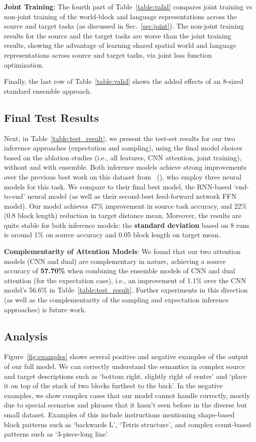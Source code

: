 \documentclass[letterpaper]{article} %
\newcommand{\newcite}[1]{\citeauthor{#1} (\citeyear{#1})}
\begin{document}
\textbf{Joint Training}:
The fourth part of Table~\ref{table:valid} compares  joint training vs non-joint training of the world-block and language representations across the source and target tasks (as discussed in Sec.~\ref{sec:joint}). The non-joint training results for the source and the target tasks are worse than the joint training results, showing the advantage of learning shared spatial world and language representations across source and target tasks, via joint loss function optimization.

Finally, the last row of Table~\ref{table:valid} shows the added effects of an 8-sized standard ensemble approach.


\vspace{-1.65mm}
\subsection{Final Test Results}
\label{sec:finaltest}
Next, in Table~\ref{table:test_result}, we present the test-set results for our two inference approaches (expectation and sampling), using the final model choices based on the ablation studies (i.e., all features, CNN attention, joint training), without and with ensemble.
Both inference models achieve strong improvements over the previous best work on this dataset from~\newcite{bisk2016natural}, who employ three neural models for this task. We compare to their final best model, the RNN-based `end-to-end' neural model (as well as their second-best feed-forward network FFN model).
Our model achieves 47\% improvement in source task accuracy, and 22\% (0.8 block length) reduction in target distance mean.
Moreover, the results are quite stable for both inference models: the \textbf{standard deviation} based on 8 runs is around 1\% on source accuracy and 0.05 block length on target mean.

\textbf{Complementarity of Attention Models}:
We found that our two attention models (CNN and dual) are complementary in nature, achieving a source accuracy of \textbf{57.70\%} when combining the ensemble models of CNN and dual attention (for the expectation case), i.e., an improvement of 1.1\% over the CNN model's 56.6\% in Table~\ref{table:test_result}.
Further experiments in this direction (as well as the complementarity of the sampling and expectation inference approaches) is future work.



\subsection{Analysis}
Figure~\ref{fig:examples} shows several positive and negative examples of the output of our full model. We can correctly understand the semantics in complex source and target descriptions such as `bottom right, slightly right of center' and `place it on top of the stack of two blocks furthest to the back'. In the negative examples, we show complex cases that our model cannot handle correctly, mostly due to special scenarios and phrases that it hasn't seen before in the diverse but small dataset. Examples of this include instructions mentioning shape-based block patterns such as `backwards L', `Tetris structure', and complex count-based patterns such as `3-piece-long line'.
\end{document}
